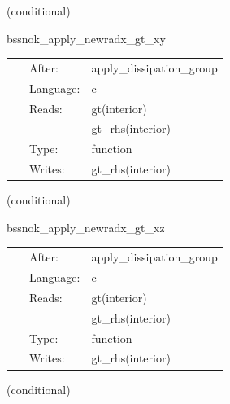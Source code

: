 \vspace{5mm}

   (conditional) 

\hspace{5mm} bssnok\_apply\_newradx\_gt\_xy 



\hspace{5mm}

 \begin{tabular*}{160mm}{cll} 
~ & After:  & apply\_dissipation\_group \\ 
~ & Language:  & c \\ 
~ & Reads:  & gt(interior) \\ 
~& ~ &gt\_rhs(interior)\\ 
~ & Type:  & function \\ 
~ & Writes:  & gt\_rhs(interior) \\ 
\end{tabular*} 


\vspace{5mm}

   (conditional) 

\hspace{5mm} bssnok\_apply\_newradx\_gt\_xz 



\hspace{5mm}

 \begin{tabular*}{160mm}{cll} 
~ & After:  & apply\_dissipation\_group \\ 
~ & Language:  & c \\ 
~ & Reads:  & gt(interior) \\ 
~& ~ &gt\_rhs(interior)\\ 
~ & Type:  & function \\ 
~ & Writes:  & gt\_rhs(interior) \\ 
\end{tabular*} 


\vspace{5mm}

   (conditional) 

